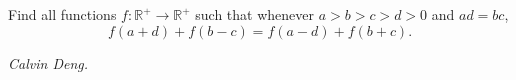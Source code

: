 Find all functions $f:\mathbb{R}^+\to\mathbb{R}^+$ such that whenever $a>b>c>d>0$ and $ad=bc$,
\[f(a+d)+f(b-c)=f(a-d)+f(b+c).\]

\textit{Calvin Deng.}